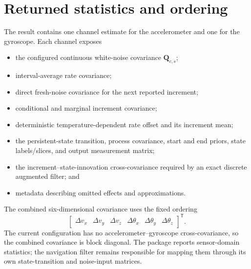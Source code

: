 \documentclass[11pt,oneside,headings=big]{scrreprt}
\newcommand{\mat}[1]{\bm{#1}}
\begin{document}
    \section{Returned statistics and ordering}
    The result contains one channel estimate for the accelerometer and one for the
    gyroscope. Each channel exposes
    \begin{itemize}
        \item the configured continuous white-noise covariance \(\mat Q_{c,s}\);
        \item interval-average rate covariance;
        \item direct fresh-noise covariance for the next reported increment;
        \item conditional and marginal increment covariance;
        \item deterministic temperature-dependent rate offset and its increment mean;
        \item the persistent-state transition, process covariance, start and end
        priors, state labels/slices, and output measurement matrix;
        \item the increment--state-innovation cross-covariance required by an exact
        discrete augmented filter; and
        \item metadata describing omitted effects and approximations.
    \end{itemize}
    The combined six-dimensional covariance uses the fixed ordering
    \begin{equation}
        \begin{bmatrix}
            \Delta v_x & \Delta v_y & \Delta v_z &
            \Delta\theta_x & \Delta\theta_y & \Delta\theta_z
        \end{bmatrix}^{\mathsf T}.
    \end{equation}
    The current configuration has no accelerometer--gyroscope cross-covariance, so
    the combined covariance is block diagonal. The package reports sensor-domain
    statistics; the navigation filter remains responsible for mapping them through
    its own state-transition and noise-input matrices.
\end{document}
